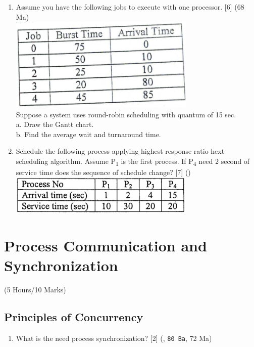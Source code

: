 \documentclass[12pt]{article}
\newcommand{\sub}[1]{\textsubscript{#1}}
\begin{document}
\begin{enumerate}
			\item Assume you have the following jobs to execute with one processor. \hfill [6] (68 Ma)\\
			\includegraphics[width=3.5in]{./pics/os_22}\\
			Suppose a system uses round-robin scheduling with quantum of 15 sec.\\
			a. Draw the Gantt chart.\\
			b. Find the average wait and turnaround time.

			\item Schedule the following process applying highest response ratio hext scheduling algorithm. Assume P\sub{1} is the first process. If P\sub{4} need 2 second of service time does the sequence of schedule change? \hfill [7] ()\\
			\includegraphics[width=3.5in]{./pics/os_24}
		\end{enumerate}

	\pagebreak
\section{Process Communication and Synchronization}
	\begin{center}(5 Hours/10 Marks)\end{center}
	\subsection{Principles of Concurrency}
		\begin{enumerate}[noitemsep, topsep=0pt]
			\item What is the need process synchronization? \hfill [2] (, \texttt{80 Ba}, 72 Ma)
		\end{enumerate}
		
\end{document}
